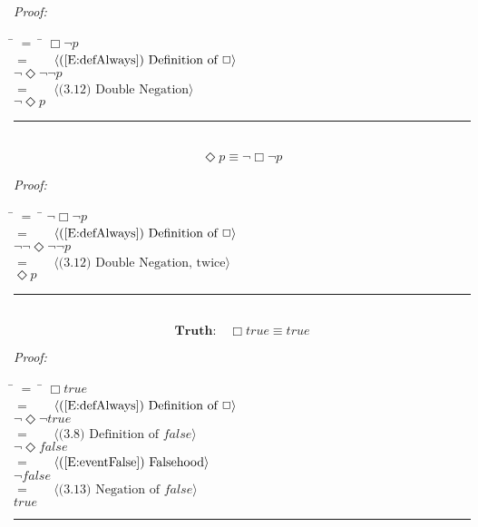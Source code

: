 \documentclass[fleqn, leqno]{article}
\newcommand{\lgap}{2pt}                             %
\newcommand{\mymathindent}{24pt}                    %
\newcommand{\Event}{\Diamond}
\newcommand{\Always}{\Box}
\newcommand{\myqed}{\hfill\rule[-.23ex]{1.2ex}{2.0ex}}
\newcommand{\Gll} {\langle}                         %
\newcommand{\Ggg} {\rangle}                         %
\newcommand{\Hint}[1]     {\ \ \ $\Gll              \mbox{#1} \Ggg$ }   %
\begin{document}
\emph{Proof:}
\begin{tabbing}
\hspace{\mymathindent} \= $= \;$ \= \kill
  \> \>   $\Always\lnot p$\\[\lgap]
  \> $=$  \>  \Hint{(\ref{E:defAlways}) Definition of $\Always$}\\[\lgap]
  \> \>   $\lnot\Event\lnot\lnot p$\\[\lgap]
  \> $=$  \>  \Hint{(3.12) Double Negation}\\[\lgap]
  \> \>   $\lnot\Event p$\\[\lgap]
\end{tabbing}
\myqed\\[\lgap]


\begin{equation}\label{E:eventAsAlways}
\Event p \equiv \lnot\Always\lnot p
\end{equation}

\emph{Proof:}
\begin{tabbing}
\hspace{\mymathindent} \= $= \;$ \= \kill
  \> \>   $\lnot\Always\lnot p$\\[\lgap]
  \> $=$  \>  \Hint{(\ref{E:defAlways}) Definition of $\Always$}\\[\lgap]
  \> \>   $\lnot\lnot\Event\lnot\lnot p$\\[\lgap]
  \> $=$  \>  \Hint{(3.12) Double Negation, twice}\\[\lgap]
  \> \>   $\Event p$\\[\lgap]
\end{tabbing}
\myqed\\[\lgap]


\begin{equation}\label{E:alwaysTrue}
\textbf{Truth:}\quad \Always true \equiv true
\end{equation}

\emph{Proof:}
\begin{tabbing}
\hspace{\mymathindent} \= $= \;$ \= \kill
  \> \>   $\Always true$\\[\lgap]
  \> $=$  \>  \Hint{(\ref{E:defAlways}) Definition of $\Always$}\\[\lgap]
  \> \>   $\lnot\Event\lnot true$\\[\lgap]
  \> $=$  \>  \Hint{(3.8) Definition of $false$}\\[\lgap]
  \> \>   $\lnot\Event false$\\[\lgap]
  \> $=$  \>  \Hint{(\ref{E:eventFalse}) Falsehood}\\[\lgap]
  \> \>   $\lnot false$\\[\lgap]
  \> $=$  \>  \Hint{(3.13) Negation of $false$}\\[\lgap]
  \> \>   $true$\\[\lgap]
\end{tabbing}
\myqed\\[\lgap]
\end{document}

